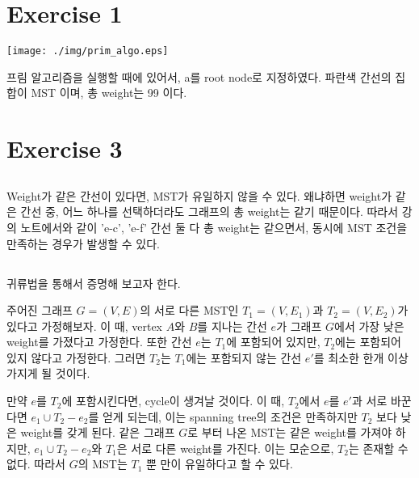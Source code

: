 \documentclass{article}
\begin{document}
\section{Exercise 1}
\begin{center}
    \texttt{[image: ./img/prim\_algo.eps]}
\end{center}
프림 알고리즘을 실행할 때에 있어서, a를 root node로 지정하였다.
파란색 간선의 집합이 MST 이며, 총 weight는 99 이다.

\section{Exercise 3}
\subsection{}
Weight가 같은 간선이 있다면, MST가 유일하지 않을 수 있다. 왜냐하면 weight가 같은 간선 중, 어느 하나를 선택하더라도
그래프의 총 weight는 같기 때문이다. 따라서 강의 노트에서와 같이 'e-c', 'e-f' 간선 둘 다 총 weight는 같으면서, 동시에 MST 조건을 만족하는 경우가 발생할 수 있다.
\subsection{}
귀류법을 통해서 증명해 보고자 한다.

주어진 그래프 $G=(V, E)$의 서로 다른 MST인 $T_1 = (V, E_1)$과 $T_2 = (V, E_2)$가 있다고 가정해보자.
이 때, vertex $A$와 $B$를 지나는 간선 $e$가 그래프 $G$에서 가장 낮은 weight를 가졌다고 가정한다.
또한 간선 $e$는 $T_1$에 포함되어 있지만, $T_2$에는 포함되어 있지 않다고 가정한다.
그러면 $T_2$는 $T_1$에는 포함되지 않는 간선 $e'$를 최소한 한개 이상 가지게 될 것이다.

만약 $e$를 $T_2$에 포함시킨다면, cycle이 생겨날 것이다.
이 때, $T_2$에서 $e$를 $e'$과 서로 바꾼다면 $e_1 \cup T_2 - e_2$를 얻게 되는데, 이는 spanning tree의 조건은 만족하지만 $T_2$ 보다 낮은 weight를 갖게 된다.
같은 그래프 $G$로 부터 나온 MST는 같은 weight를 가져야 하지만, $e_1 \cup T_2 - e_2$와 $T_1$은 서로 다른 weight를 가진다.
이는 모순으로, $T_2$는 존재할 수 없다. 따라서 $G$의 MST는 $T_1$ 뿐 만이 유일하다고 할 수 있다.
\end{document}
